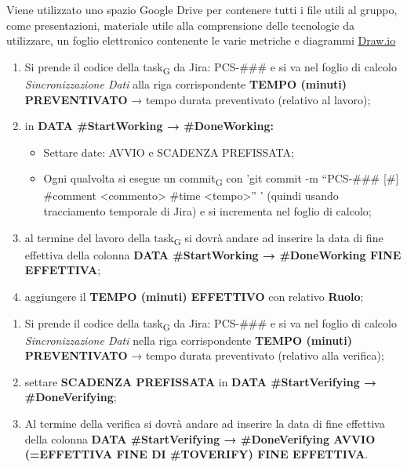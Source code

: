         Viene utilizzato uno spazio Google Drive per contenere tutti i file utili al gruppo, come presentazioni, materiale utile alla comprensione delle tecnologie da utilizzare, un foglio elettronico contenente le varie metriche e diagrammi \href{https://drawio-app.com/}{Draw.io}

        \begin{enumerate}
        	\item Si prende il codice della task\textsubscript{G} da Jira: PCS-\#\#\# e si va nel foglio di calcolo \textit{Sincronizzazione Dati} alla riga corrispondente \textbf{TEMPO (minuti) PREVENTIVATO} → tempo durata preventivato (relativo al lavoro);
        	\item in \textbf{DATA \#StartWorking → \#DoneWorking: }
        	\begin{itemize}
        		\item Settare date: AVVIO e SCADENZA PREFISSATA;
        		\item Ogni qualvolta si esegue un commit\textsubscript{G} con 'git {commit} -m “PCS-\#\#\# [\#<eventuale transizione>] \#comment <commento> \#time <tempo>” ' (quindi usando tracciamento temporale di Jira) e si incrementa nel foglio di calcolo;
        	\end{itemize}
        	\item al termine del lavoro della task\textsubscript{G} si dovrà andare ad inserire la data di fine effettiva della colonna \textbf{DATA \#StartWorking → \#DoneWorking FINE EFFETTIVA};
        	\item aggiungere il \textbf{TEMPO (minuti) EFFETTIVO} con relativo \textbf{Ruolo};
        \end{enumerate}

    	\begin{enumerate}
    		\item Si prende il codice della task\textsubscript{G} da Jira: PCS-\#\#\# e si va nel foglio di calcolo \textit{Sincronizzazione Dati} nella riga corrispondente \textbf{TEMPO (minuti) PREVENTIVATO} → tempo durata preventivato (relativo alla verifica);
    		\item settare \textbf{SCADENZA PREFISSATA} in \textbf{DATA \#StartVerifying → \#DoneVerifying};
    		\item Al termine della verifica si dovrà andare ad inserire la data di fine effettiva della colonna \textbf{DATA \#StartVerifying → \#DoneVerifying AVVIO (=EFFETTIVA FINE DI \#TOVERIFY) FINE EFFETTIVA}.
    	\end{enumerate}

